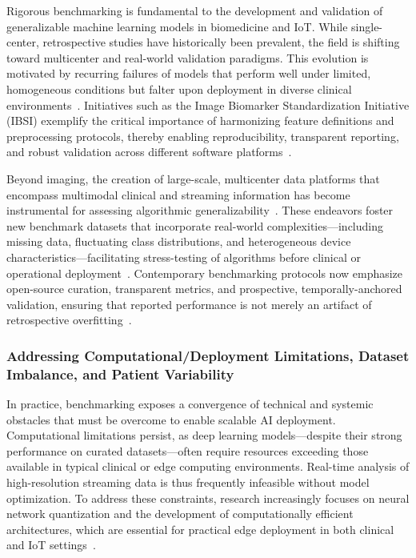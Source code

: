 \documentclass[sigconf]{acmart}
\begin{document}
Rigorous benchmarking is fundamental to the development and validation of generalizable machine learning models in biomedicine and IoT. While single-center, retrospective studies have historically been prevalent, the field is shifting toward multicenter and real-world validation paradigms. This evolution is motivated by recurring failures of models that perform well under limited, homogeneous conditions but falter upon deployment in diverse clinical environments~\cite{ref31,ref33,ref44}. Initiatives such as the Image Biomarker Standardization Initiative (IBSI) exemplify the critical importance of harmonizing feature definitions and preprocessing protocols, thereby enabling reproducibility, transparent reporting, and robust validation across different software platforms~\cite{ref49,ref50,ref54}.

Beyond imaging, the creation of large-scale, multicenter data platforms that encompass multimodal clinical and streaming information has become instrumental for assessing algorithmic generalizability~\cite{ref34,ref35,ref37,ref45,ref48,ref65,ref83}. These endeavors foster new benchmark datasets that incorporate real-world complexities—including missing data, fluctuating class distributions, and heterogeneous device characteristics—facilitating stress-testing of algorithms before clinical or operational deployment~\cite{ref83}. Contemporary benchmarking protocols now emphasize open-source curation, transparent metrics, and prospective, temporally-anchored validation, ensuring that reported performance is not merely an artifact of retrospective overfitting~\cite{ref31,ref44,ref54}.

\subsubsection{Addressing Computational/Deployment Limitations, Dataset Imbalance, and Patient Variability}

In practice, benchmarking exposes a convergence of technical and systemic obstacles that must be overcome to enable scalable AI deployment. Computational limitations persist, as deep learning models—despite their strong performance on curated datasets—often require resources exceeding those available in typical clinical or edge computing environments. Real-time analysis of high-resolution streaming data is thus frequently infeasible without model optimization. To address these constraints, research increasingly focuses on neural network quantization and the development of computationally efficient architectures, which are essential for practical edge deployment in both clinical and IoT settings~\cite{ref98,ref102,ref103,ref106}.
\end{document}
